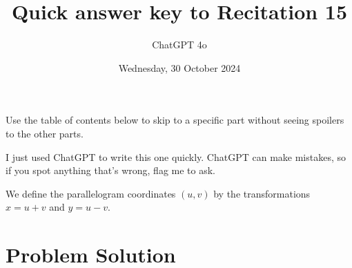 \documentclass[11pt]{article}
\begin{document}
\title{Quick answer key to Recitation 15}
\author{ChatGPT 4o}
\date{Wednesday, 30 October 2024}
\maketitle

Use the table of contents below to skip to a specific part
without seeing spoilers to the other parts.

I just used ChatGPT to write this one quickly.
ChatGPT can make mistakes, so if you spot anything that's wrong, flag me to ask.

\tableofcontents



We define the parallelogram coordinates \( (u, v) \) by the transformations \( x = u + v \) and \( y = u - v \).

\newpage

\section{Problem Solution}
\end{document}
